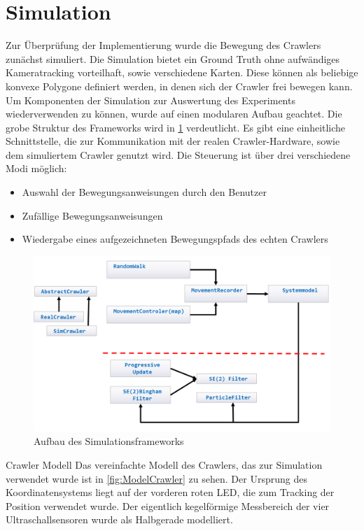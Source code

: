 \section{Simulation}
Zur Überprüfung der Implementierung wurde die Bewegung des Crawlers zunächst simuliert. Die Simulation bietet ein Ground Truth ohne aufwändiges Kameratracking vorteilhaft, sowie verschiedene Karten. Diese können als beliebige konvexe Polygone definiert werden, in denen sich der Crawler frei bewegen kann.
Um Komponenten der Simulation zur Auswertung des Experiments wiederverwenden zu können, wurde auf einen modularen Aufbau geachtet. Die grobe Struktur des Frameworks wird in \ref{fig:class} verdeutlicht. Es gibt eine einheitliche Schnittstelle, die zur Kommunikation mit der realen Crawler-Hardware, sowie dem simuliertem Crawler genutzt wird. Die Steuerung ist über drei verschiedene Modi möglich:
\begin{itemize}
	\item Auswahl der Bewegungsanweisungen durch den Benutzer
	\item Zufällige Bewegungsanweisungen
	\item Wiedergabe eines aufgezeichneten Bewegungspfads des echten Crawlers
\end{itemize}

\begin{figure}
	\centering
	\includegraphics[width=0.9\linewidth]{Images/class.png}  
	\caption{Aufbau des Simulationsframeworks}
	\label{fig:class}
\end{figure}

Crawler Modell
Das vereinfachte Modell des Crawlers, das zur Simulation verwendet wurde ist in \ref{fig:ModelCrawler} zu sehen. Der Ursprung des Koordinatensystems liegt auf der vorderen roten LED, die zum Tracking der Position verwendet wurde. Der eigentlich kegelförmige Messbereich der vier Ultraschallsensoren wurde als Halbgerade modelliert.

